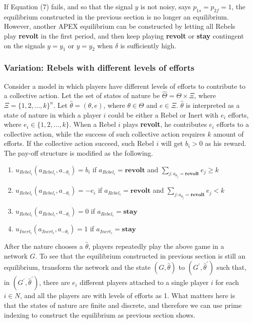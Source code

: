 \documentclass[12pt,letter]{article}
\theoremstyle{definition}
\theoremstyle{remark}
\theoremstyle{claim}
\begin{document}
If Equation (7) fails, and so that the signal $y$ is not noisy, says $p_{1s}=p_{2f}=1$, the equilibrium constructed in the previous section is no longer an equilibrium. However, another APEX equilibrium can be constructed by letting all Rebels play \textbf{revolt} in the first period, and then keep playing \textbf{revolt} or \textbf{stay} contingent on the signals $y=y_1$ or $y=y_2$ when $\delta$ is sufficiently high.

\subsubsection{Variation: Rebels with different levels of efforts}

Consider a model in which players have different levels of efforts to contribute to a collective action. Let the set of states of nature be $\hat{\Theta}=\Theta \times \Xi$, where $\Xi=\{1,2,...,k\}^n$. Let $\hat{\theta}=(\theta,e)$, where $\theta\in \Theta$ and $e\in \Xi$. $\hat{\theta}$ is interpreted as a state of nature in which a player $i$ could be either a Rebel or Inert with $e_i$ efforts, where $e_i\in \{1,2,...,k\}$. When a Rebel $i$ plays \textbf{revolt}, he contributes $e_i$ efforts to a collective action, while the success of such collective action requires $k$ amount of efforts. If the collective action succeed, such Rebel $i$ will get $b_i>0$ as his reward. The pay-off structure is modified as the following.
\begin{enumerate}
\item $u_{Rebel_i}(a_{Rebel_i},a_{-\theta_i})=b_i$ if $a_{Rebel_i}=\textbf{revolt}$ and $\sum_{j:a_{\theta_j}=\textbf{revolt}}e_j\geq k$
\item $u_{Rebel_i}(a_{Rebel_i},a_{-\theta_i})=-e_i$ if $a_{Rebel_i}=\textbf{revolt}$ and $\sum_{j:a_{\theta_j}=\textbf{revolt}}e_j< k$
\item $u_{Rebel_i}(a_{Rebel_i},a_{-\theta_i})=0$ if $a_{Rebel_i}=\textbf{stay}$
\item $u_{Inert_i}(a_{Inert_i},a_{-\theta_i})=1$ if $a_{Inert_i}=\textbf{stay}$
\end{enumerate}

After the nature chooses a $\hat{\theta}$, players repeatedly play the above game in a network $G$. To see that the equilibrium constructed in previous section is still an equilibrium, transform the network and the state $(G,\hat{\theta})$ to $(G^{'},\hat{\theta}^{'})$ such that, in $(G^{'},\hat{\theta}^{'})$, there are $e_i$ different players attached to a single player $i$ for each $i\in N$, and all the players are with levels of efforts as 1. What matters here is that the states of nature are finite and discrete, and therefore we can use prime indexing to construct the equilibrium as previous section shows.
\end{document}
